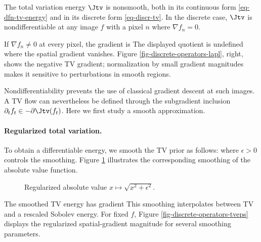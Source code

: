 The total variation energy $\Jtv$ is nonsmooth, both in its continuous form \eqref{eq-dfn-tv-energy} and in its discrete form \eqref{eq-discr-tv}. In the discrete case, $\Jtv$ is nondifferentiable at any image $f$ with a pixel $n$ where $\nabla f_n = 0$.

If $\nabla f_n\neq0$ at every pixel, the gradient is
The displayed quotient is undefined where the spatial gradient vanishes. Figure \ref{fig-discrete-operators-lapl}, right, shows the negative TV gradient; normalization by small gradient magnitudes makes it sensitive to perturbations in smooth regions.

Nondifferentiability prevents the use of classical gradient descent at such images. A TV flow can nevertheless be defined through the subgradient inclusion $\partial_t f_t\in-\partial\Jtv(f_t)$. Here we first study a smooth approximation.

\paragraph{Regularized total variation.}
	
To obtain a differentiable energy, we smooth the TV prior as follows:
where $\epsilon>0$ controls the smoothing. Figure \ref{fig-regul-abs} illustrates the corresponding smoothing of the absolute value function.


\begin{figure}[tbp]
\centering
{}\hfill
{}
\caption{Regularized absolute value $x \mapsto \sqrt{x^2+\epsilon^2}$.}
\label{fig-regul-abs}
\end{figure}

The smoothed TV energy has gradient
This smoothing interpolates between TV and a rescaled Sobolev energy. For fixed $f$,
Figure \ref{fig-discrete-operators-tveps} displays the regularized spatial-gradient magnitude for several smoothing parameters.

